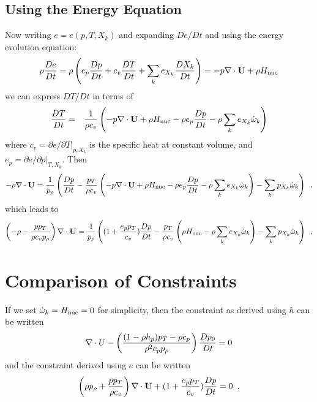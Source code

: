 \subsection{Using the Energy Equation}

Now writing $e = e(p,T,X_k)$ and expanding $De/Dt$ and using the energy evolution equation:
\begin{equation}
\rho \frac{D e}{Dt}  = \rho \left( e_p \frac{D p}{Dt} + c_v \frac{D T}{Dt} + \sum_k e_{X_k} \frac{D X_k}{Dt} \right)
                     = -p \nabla \cdot {\bf U} + \rho {H_{\rm nuc}}
\end{equation}
we can express $DT/Dt$ in terms of 
\begin{eqnarray*}
\frac{DT}{Dt} &=& \frac{1}{\rho c_v} \left(
                  -p \nabla \cdot {\bf U} + \rho {H_{\rm nuc}}
                 - \rho e_p \frac{D p}{Dt}
                 - \rho \sum_k e_{X_k} \dot{\omega}_k   \right)
\end{eqnarray*}
where $c_v = \left.\partial e/\partial T\right|_{p,X_k}$ is the
specific heat at constant volume,
and $e_p = \left.\partial e/\partial p\right|_{T,X_k}.$
Then
\begin{equation}
-\rho \nabla \cdot {\bf U} = 
    \frac{1}{p_\rho} \left( \frac{D p}{Dt} 
    - \frac{p_T}{\rho c_v} \left(
                 -p \nabla \cdot {\bf U} + \rho {H_{\rm nuc}}
                 - \rho e_p \frac{D p}{Dt}
                 - \rho \sum_k e_{X_k} \dot{\omega}_k   \right)
    - \sum_k p_{X_k} {\dot{\omega}}_k \right) \enskip ,
\end{equation}
which leads to 
\begin{equation}
\left(-\rho -  \frac{p p_T}{\rho c_v p_\rho} \right) \nabla \cdot {\bf U} = 
    \frac{1}{p_\rho} \left( (1 + \frac{e_p p_T}{c_v}) \frac{D p}{Dt} 
                           - \frac{p_T}{\rho c_v} \left(
                                        \rho {H_{\rm nuc}}
                                        - \rho \sum_k e_{X_k} \dot{\omega}_k   \right)
    - \sum_k p_{X_k} {\dot{\omega}}_k \right) \enskip ,
\end{equation}

\section{Comparison of Constraints}

If we set $\dot{\omega}_k = {H_{\rm nuc}} = 0$ for simplicity, then the constraint as derived using $h$ can be written 
\begin{equation}
\nabla \cdot U
- \left( \frac{(1 - \rho h_p )p_T - \rho c_p}{\rho^2
  c_p p_\rho} \right) \frac{D p_0}{D t} = 0
\end{equation}
and the constraint derived using $e$ can be written
\begin{equation}
\left(\rho p_\rho + \frac{p p_T}{\rho c_v} \right) \nabla \cdot {\bf U} +
      (1 + \frac{e_p p_T}{c_v}) \frac{D p}{Dt} = 0 \enskip .
\end{equation}

